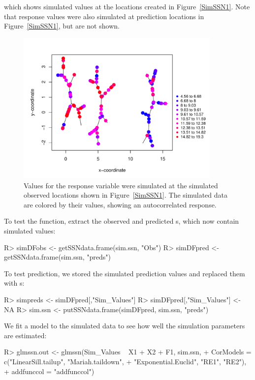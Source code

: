 \documentclass[nojss]{jss}
\renewenvironment{Schunk}{\vspace{\topsep}}{\vspace{\topsep}}
\begin{document}
which shows simulated values at the locations created in
Figure~\ref{SimSSN1}. Note that response values were also simulated at prediction locations in Figure~\ref{SimSSN1}, but are not shown.
\begin{figure}[h]
  \begin{center}
    \includegraphics[keepaspectratio=true, width = 100mm]{Figures/jss984Fig-SimSSN2}
    \caption{Values for the response variable were simulated at the simulated observed locations shown in Figure~\ref{SimSSN1}. The simulated data are colored by their values, showing an autocorrelated response. \label{SimSSN2}}
  \end{center}
\end{figure}

To test the function, extract the observed and predicted
 s, which now contain simulated
values:
\begin{Schunk}
\begin{Sinput}
R> simDFobs <- getSSNdata.frame(sim.ssn, "Obs")
R> simDFpred <- getSSNdata.frame(sim.ssn, "preds")
\end{Sinput}
\end{Schunk}

To test prediction, we stored the simulated prediction values and
replaced them with s:
\begin{Schunk}
\begin{Sinput}
R> simpreds <- simDFpred[,"Sim_Values"]
R> simDFpred[,"Sim_Values"] <- NA
R> sim.ssn <- putSSNdata.frame(simDFpred, sim.ssn, "preds")
\end{Sinput}
\end{Schunk}

We fit a model to the simulated data to see how well the simulation
parameters are estimated:
\begin{Schunk}
\begin{Sinput}
R> glmssn.out <- glmssn(Sim_Values ~ X1 + X2 + F1, sim.ssn,
+     CorModels = c("LinearSill.tailup", "Mariah.taildown",
+     "Exponential.Euclid", "RE1", "RE2"),
+     addfunccol = "addfunccol")
\end{Sinput}
\end{Schunk}
\end{document}
